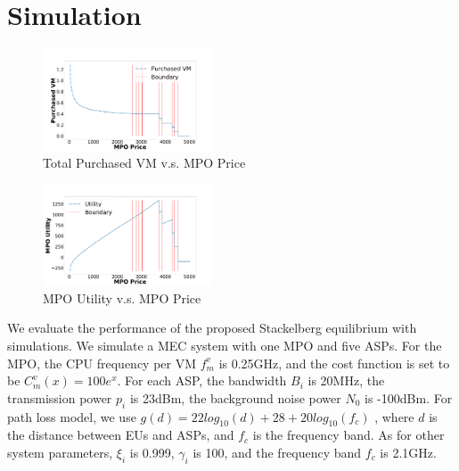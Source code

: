 \documentclass[conference]{IEEEtran}
\begin{document}
\section{Simulation} \label{sec:simulation}

\begin{figure}
    \centering
  \includegraphics[width=0.45\textwidth]{5GDDoS_Game_vm_number.pdf}
  \caption{Total Purchased VM v.s. MPO Price}
\vspace{-0.8em}
  \label{subfig-1:VMnum}
\end{figure}
\begin{figure}
    \centering
  \includegraphics[width=0.45\textwidth]{5GDDoS_Game_utility.pdf}
\caption{MPO Utility v.s. MPO Price}
\vspace{-0.8em}
\label{subfig-2:MPOutil}
\end{figure}

We evaluate the performance of the proposed Stackelberg equilibrium with simulations. We simulate a MEC system with one MPO and five ASPs. For the MPO, the CPU frequency per VM $f_m^v$ is 0.25GHz, and the cost function is set to be $C_m^v(x) = 100e^x$. For each ASP, the bandwidth $B_i$ is 20MHz, the transmission power $p_i$ is 23dBm\cite{3gpp.36.101}, the background noise power $N_0$ is -100dBm\cite{chen2015efficient}. For path loss model, we use $g(d)=22log_{10}(d)+28+20log_{10}(f_c)$ \cite{3gpp.36.814}, where $d$ is the distance between EUs and ASPs, and $f_c$ is the frequency band. As for other system parameters, $\xi_{i}$ is 0.999, $\gamma_i$ is 100, and the frequency band $f_c$ is 2.1GHz.
\end{document}
